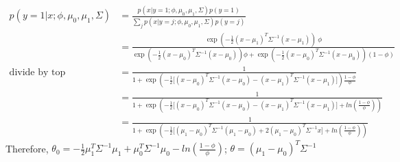 \begin{answer}

$$
\begin{aligned}
p(y=1|x; \phi, \mu_0, \mu_1, \Sigma) &= \frac{p(x|y=1; \phi, \mu_0, \mu_1, \Sigma) p(y=1)}{\sum_j  p(x|y=j; \phi, \mu_0, \mu_1, \Sigma) p(y=j)}\\
&= \frac{\exp\left(-\frac{1}{2}(x-\mu_{1})^T \Sigma^{-1} (x-\mu_{1})\right)\ \phi}{ \exp\left(-\frac{1}{2}(x-\mu_{0})^T \Sigma^{-1} (x-\mu_{0})\right)\phi + \exp\left(-\frac{1}{2}(x-\mu_{0})^T \Sigma^{-1} (x-\mu_{0})\right)(1-\phi)} \\
\mbox{divide by top}&= \frac{1}{1 + \exp(-\frac{1}{2}\big[(x-\mu_{0})^T \Sigma^{-1} (x-\mu_{0})-(x-\mu_{1})^T \Sigma^{-1} (x-\mu_{1}) \big])\frac{1-\phi}{\phi}} \\
&= \frac{1}{1 + \exp(-\frac{1}{2}\big[(x-\mu_{0})^T \Sigma^{-1} (x-\mu_{0})-(x-\mu_{1})^T \Sigma^{-1} (x-\mu_{1}) \big]+ln(\frac{1-\phi}{\phi}))} \\
&= \frac{1}{1 + \exp(-\frac{1}{2}\big[ (\mu_1-\mu_0)^T \Sigma^{-1} (\mu_1-\mu_0) + 2 (\mu_1-\mu_0)^T \Sigma^{-1} x \big]+ln(\frac{1-\phi}{\phi}))} 
\end{aligned}
$$
Therefore, $\theta_0 =-\frac{1}{2}\mu_1^T \Sigma^{-1} \mu_1 + \mu_0^T \Sigma^{-1} \mu_0 - ln(\frac{1-\phi}{\phi})$; $\theta = (\mu_1-\mu_0)^T \Sigma^{-1}  $
\end{answer}
